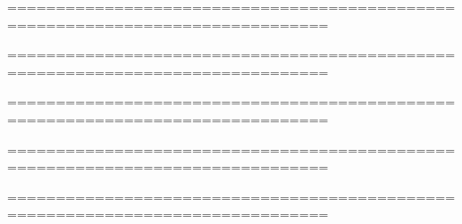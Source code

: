===============================================================================




===============================================================================



===============================================================================


===============================================================================




===============================================================================
